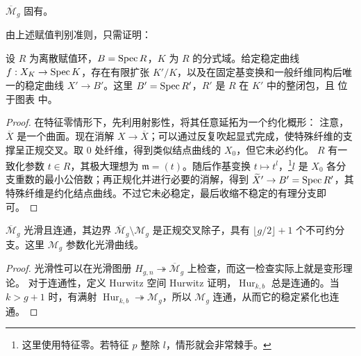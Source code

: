 \begin{theorem}\label{thm:2.13}$\overline{\mathcal M}_g$ 固有。\end{theorem}
由上述赋值判别准则，只需证明：
\begin{theorem}\label{thm:2.14}
设 $R$ 为离散赋值环，$B=\operatorname{Spec} R$，$K$ 为 $R$ 的分式域。给定稳定曲线 $f:X_K\to\operatorname{Spec} K$，存在有限扩张 $K'/K$，以及在固定基变换和一般纤维同构后唯一的稳定曲线 $X'\to B'$。这里 $B'=\operatorname{Spec} R'$，$R'$ 是 $R$ 在 $K'$ 中的整闭包，且
位于图表
中。
\end{theorem}
\begin{proof}
在特征零情形下，先利用射影性，将其任意延拓为一个约化概形：
注意，$\overline X$ 是一个曲面。现在消解 $X\to\overline X$；可以通过反复吹起显式完成，使特殊纤维的支撑呈正规交叉。取 $0$ 处纤维，得到类似结点曲线的 $X_0$，但它未必约化。
$R$ 有一致化参数 $t\in R$，其极大理想为 $\mathfrak m=(t)$。随后作基变换 $t\mapsto t^l$，\footnote{这里使用特征零。若特征 $p$ 整除 $l$，情形就会非常棘手。}$l$ 是 $X_0$ 各分支重数的最小公倍数；再正规化并进行必要的消解，得到 $\widetilde X'\to B'=\operatorname{Spec} R'$，其特殊纤维是约化结点曲线。不过它未必稳定，最后收缩不稳定的有理分支即可。
\end{proof}
\begin{theorem}\label{thm:2.15}
$\overline{\mathcal M}_g$ 光滑且连通，其边界 $\overline{\mathcal M}_g\setminus\mathcal M_g$ 是正规交叉除子，具有 $\lfloor g/2\rfloor+1$ 个不可约分支。这里 $\mathcal M_g$ 参数化光滑曲线。
\end{theorem}
\begin{proof}
光滑性可以在光滑图册 $H_{g,n}\twoheadrightarrow\overline{\mathcal M}_g$ 上检查，而这一检查实际上就是变形理论。
对于连通性，定义 Hurwitz 空间
Hurwitz 证明，$\operatorname{Hur}_{k,b}$ 总是连通的。当 $k>g+1$ 时，有满射 $\operatorname{Hur}_{k,b}\twoheadrightarrow\mathcal M_g$，所以 $\mathcal M_g$ 连通，从而它的稳定紧化也连通。
\end{proof}

